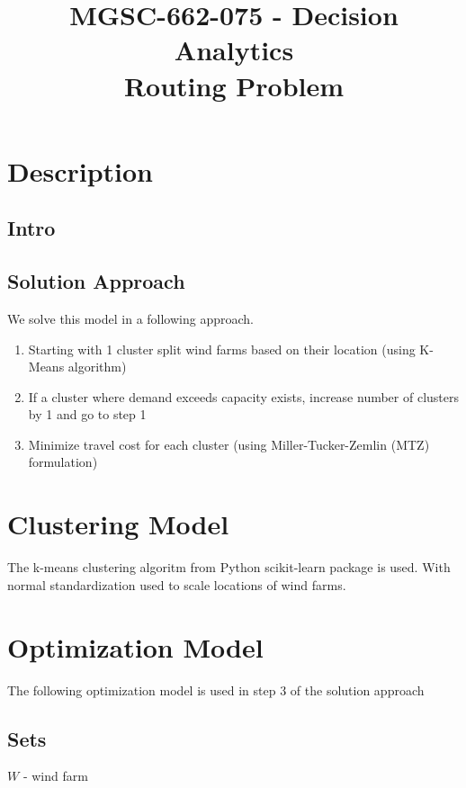 \documentclass[11pt, oneside]{article}   	%
\title{MGSC-662-075 - Decision Analytics \\ Routing Problem}
\author{}
\begin{document}
\maketitle


\section*{Description}
\subsection*{Intro}

\subsection*{Solution Approach}
We solve this model in a following approach. 
\begin{enumerate}
	\item Starting with 1 cluster split wind farms based on their location (using K-Means algorithm)
	\item If a cluster where demand exceeds capacity exists, increase number of clusters by 1 and go to step 1
	\item Minimize travel cost for each cluster (using Miller-Tucker-Zemlin (MTZ) formulation)
\end{enumerate}

\section*{Clustering Model}
The k-means clustering algoritm from Python scikit-learn package is used. With normal standardization used to scale locations of wind farms.


\section*{Optimization Model}
The following optimization model is used in step 3 of the solution approach

\subsection*{Sets}
$W$ - wind farm


\end{document}
